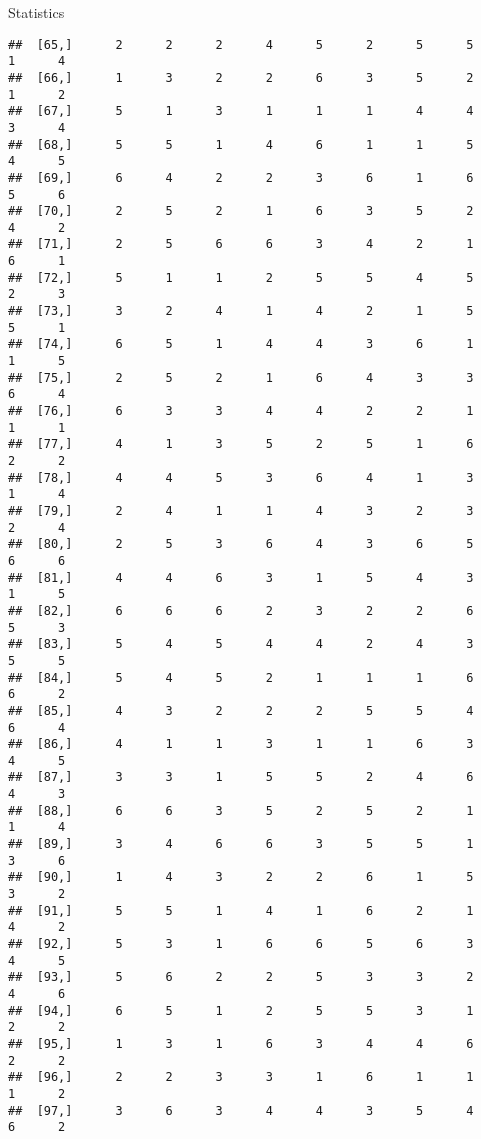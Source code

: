 \documentclass[
  ignorenonframetext,
]{beamer}
\begin{document}
\begin{frame}[fragile]{Statistics}
\begin{verbatim}
##  [65,]      2      2      2      4      5      2      5      5      1      4
##  [66,]      1      3      2      2      6      3      5      2      1      2
##  [67,]      5      1      3      1      1      1      4      4      3      4
##  [68,]      5      5      1      4      6      1      1      5      4      5
##  [69,]      6      4      2      2      3      6      1      6      5      6
##  [70,]      2      5      2      1      6      3      5      2      4      2
##  [71,]      2      5      6      6      3      4      2      1      6      1
##  [72,]      5      1      1      2      5      5      4      5      2      3
##  [73,]      3      2      4      1      4      2      1      5      5      1
##  [74,]      6      5      1      4      4      3      6      1      1      5
##  [75,]      2      5      2      1      6      4      3      3      6      4
##  [76,]      6      3      3      4      4      2      2      1      1      1
##  [77,]      4      1      3      5      2      5      1      6      2      2
##  [78,]      4      4      5      3      6      4      1      3      1      4
##  [79,]      2      4      1      1      4      3      2      3      2      4
##  [80,]      2      5      3      6      4      3      6      5      6      6
##  [81,]      4      4      6      3      1      5      4      3      1      5
##  [82,]      6      6      6      2      3      2      2      6      5      3
##  [83,]      5      4      5      4      4      2      4      3      5      5
##  [84,]      5      4      5      2      1      1      1      6      6      2
##  [85,]      4      3      2      2      2      5      5      4      6      4
##  [86,]      4      1      1      3      1      1      6      3      4      5
##  [87,]      3      3      1      5      5      2      4      6      4      3
##  [88,]      6      6      3      5      2      5      2      1      1      4
##  [89,]      3      4      6      6      3      5      5      1      3      6
##  [90,]      1      4      3      2      2      6      1      5      3      2
##  [91,]      5      5      1      4      1      6      2      1      4      2
##  [92,]      5      3      1      6      6      5      6      3      4      5
##  [93,]      5      6      2      2      5      3      3      2      4      6
##  [94,]      6      5      1      2      5      5      3      1      2      2
##  [95,]      1      3      1      6      3      4      4      6      2      2
##  [96,]      2      2      3      3      1      6      1      1      1      2
##  [97,]      3      6      3      4      4      3      5      4      6      2

\end{verbatim}
\end{frame}
\end{document}

